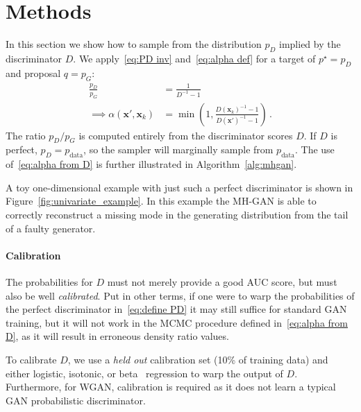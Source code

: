 \documentclass{article}
\renewcommand{\vec}[1]{{\boldsymbol{\mathbf{#1}}}} %
\newcommand{\target}{{p^\star}}
\newcommand{\prop}{q}
\newcommand{\PG}{{p_G}}
\newcommand{\PD}{{p_D}}
\newcommand{\PR}{{p_{\textrm{data}}}}
\newcommand{\accept}{\alpha}
\begin{document}


\section{Methods}
\label{sec:Methods}

In this section we show how to sample from the distribution $\PD$ implied by the discriminator $D$.
We apply~\eqref{eq:PD inv} and~\eqref{eq:alpha def} for a target of $\target=\PD$ and proposal $\prop=\PG$:
\begin{align}
  \frac{\PD}{\PG} &= \frac{1}{D^{-1} - 1} \\
  \implies
  \accept(\vec x', \vec x_k) &= \min\left(1, \frac{D(\vec x_k)^{-1} - 1}{D(\vec x')^{-1} - 1}\right)\,. \label{eq:alpha from D}
\end{align}
The ratio $\PD/\PG$ is computed entirely from the discriminator scores $D$.
If $D$ is perfect, $\PD = \PR$, so the sampler will marginally sample from $\PR$.
The use of~\eqref{eq:alpha from D} is further illustrated in Algorithm~\ref{alg:mhgan}.

A toy one-dimensional example with just such a perfect discriminator is shown in Figure~\ref{fig:univariate_example}.
In this example the MH-GAN is able to correctly reconstruct a missing mode in the generating distribution from the tail of a faulty generator.

\paragraph{Calibration}
The probabilities for $D$ must not merely provide a good AUC score, but must also be well \emph{calibrated}.
Put in other terms, if one were to warp the probabilities of the perfect discriminator in~\eqref{eq:define PD} it may still suffice for standard GAN training, but it will not work in the MCMC procedure defined in~\eqref{eq:alpha from D}, as it will result in erroneous density ratio values.

To calibrate $D$, we use a \emph{held out} calibration set (10\% of training data) and either logistic, isotonic, or beta~\citep{Kull2017} regression to warp the output of $D$.
Furthermore, for WGAN, calibration is required as it does not learn a typical GAN probabilistic discriminator.
\end{document}
